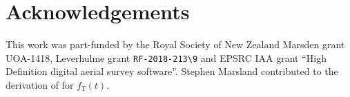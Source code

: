 \documentclass[useAMS, usenatbib, referee]{biom}\usepackage[]{graphicx}\usepackage[]{color}
\begin{document}





\section*{Acknowledgements}
This work was part-funded by the Royal Society of New Zealand  Marsden grant UOA-1418,  Leverhulme grant \verb|RF-2018-213\9| and EPSRC IAA grant ``High Definition digital aerial survey software''. Stephen Marsland contributed to the derivation of for $f_T(t)$.




\end{document}
